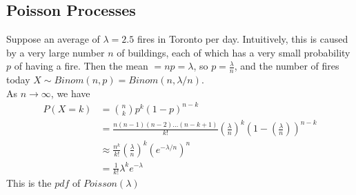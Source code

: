 \documentclass[11pt]{article}
\begin{document}
   	\subsection{Poisson Processes}
   	\example
   	Suppose an average of $\lambda = 2.5$ fires in Toronto per day. Intuitively, this is caused by a very large number $n$ of buildings, each of which has a very small probability $p$ of having a fire. Then the mean $= np = \lambda$, so $p = \frac{\lambda}{n}$, and the number of fires today $X \sim Binom(n,p) = Binom(n, \lambda/n)$.\\
   	As $n \rightarrow \infty$, we have
   	\begin{align*}
   		P(X = k) &= {n \choose k}p^k(1-p)^{n-k} \\
   		&= \frac{n(n-1)(n-2)\hdots(n-k+1)}{k!}\left(\frac{\lambda}{n}\right)^k\left(1-\left(\frac{\lambda}{n}\right)\right)^{n-k}\\
   		&\approx \frac{n^k}{k!}\left(\frac{\lambda}{n}\right)^k \left(e^{-\lambda/n}\right)^n\\
   		&= \frac{1}{k!}\lambda^k e^{-\lambda}
   	\end{align*}
   	This is the $pdf$ of $Poisson(\lambda)$
\end{document}
